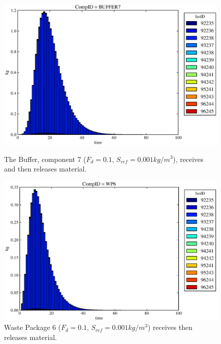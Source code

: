 \begin{figure}[ht]
\begin{minipage}[b]{0.45\linewidth}
  \includegraphics[width=\textwidth]{./mcIII3.eps}
  \caption[Case MCII Buffer Contaminants]{
    The Buffer, component 7 ($F_d=0.1$, $S_{ref}=0.001kg/m^3$), receives and then releases material.
    }
  \label{fig:mcIIIbuff}

\end{minipage}
\hspace{0.05\linewidth}
\begin{minipage}[b]{0.45\linewidth}
  \includegraphics[width=\textwidth]{./mcIII2.eps}
  \caption[Case MCII Waste Package Contaminants.]{ 
    Waste Package 6 ($F_d = 0.1$, $S_{ref}=0.001kg/m^3$) receives then releases material. 
    }
  \label{fig:mcIIIwp6}


\end{minipage}
\end{figure}
